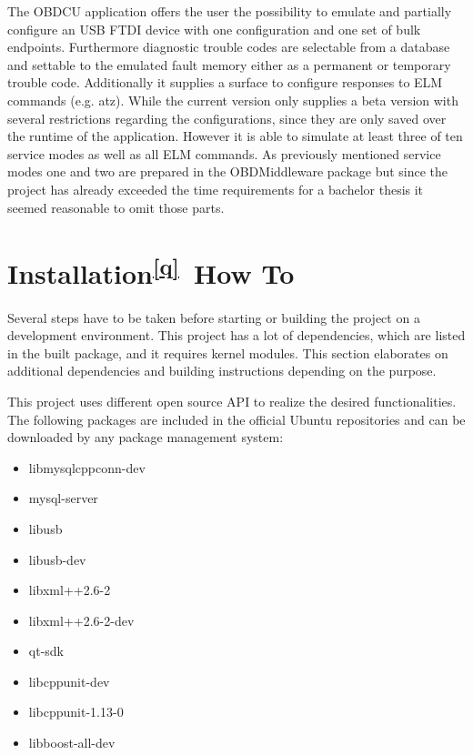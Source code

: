 {The OBDCU application offers the user the possibility to emulate and
partially configure an USB FTDI device with one configuration and one
set of bulk endpoints. Furthermore diagnostic trouble codes are
selectable from a database and settable to the emulated fault memory
either as a permanent or temporary trouble code. Additionally it
supplies a surface to configure responses to ELM commands (e.g. atz).
While the current version only supplies a beta version with several
restrictions regarding the configurations, since they are only saved
over the runtime of the application. However it is able to simulate at
least three of ten service modes as well as all ELM commands. As
previously mentioned service modes one and two are prepared in the
OBDMiddleware package but since the project has already exceeded the
time requirements for a bachelor thesis it seemed reasonable to omit
those parts. }

\hypertarget{h.pxkpe4k3lbn1}{\section{\texorpdfstring{{Installation}\textsuperscript{\protect\hyperlink{cmnt17}{{[}q{]}}}{~How
To}}{Installation{[}q{]}~How To}}\label{h.pxkpe4k3lbn1}}

{Several steps have to be taken before starting or building the project
on a development environment. This project has a lot of dependencies,
which are listed in the built package, and it requires kernel modules.
This section elaborates on additional dependencies and building
instructions depending on the purpose.}

{This project uses different open source API to realize the desired
functionalities. The following packages are included in the official
Ubuntu repositories and can be downloaded by any package management
system:}

\begin{itemize}
\tightlist
\item
  {libmysqlcppconn-dev }
\item
  {mysql-server}
\item
  {libusb }
\item
  {libusb-dev}
\item
  {libxml++2.6-2 }
\item
  {libxml++2.6-2-dev }
\item
  {qt-sdk}
\item
  {libcppunit-dev }
\item
  {libcppunit-1.13-0 }
\item
  {libboost-all-dev }
\end{itemize}

